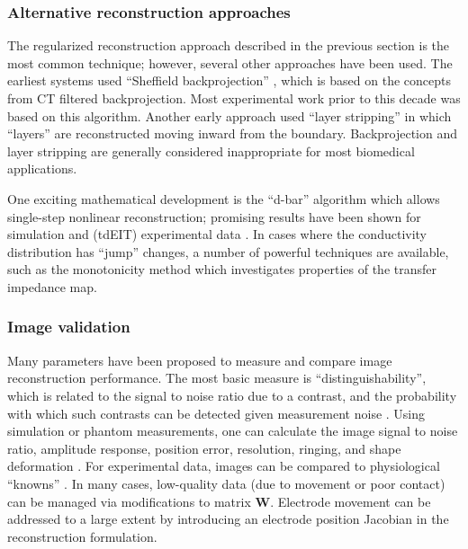 \documentclass[10pt,journal]{IEEEtran}\def\TBLWIDA{15mm}\def\TBLWIDB{60mm}
\newcommand{\WB}{\mathbf{W}}
\begin{document}
\subsubsection{Alternative reconstruction approaches}
The regularized reconstruction approach described in the
previous section is the most common technique; however, several
other approaches have been used. The earliest systems used
``Sheffield backprojection'' \cite{Brown1987Sheffield},
which is based on the concepts from CT filtered backprojection.
Most experimental work prior to this decade was based on this algorithm.
Another early approach used ``layer stripping'' \cite{Somersalo1991Layer}
in which ``layers'' are reconstructed moving inward from the boundary.
Backprojection and layer stripping are generally considered inappropriate for most biomedical applications.

One exciting mathematical development is the ``d-bar'' algorithm
which allows single-step nonlinear reconstruction; promising
results have been shown for simulation and (tdEIT) experimental
data  \cite{Herrera2015Direct}.
In cases where the conductivity distribution has ``jump'' changes,
a number of powerful techniques are available, such as the
monotonicity method \cite{Tamburrino2002Monotonicity} which
investigates properties of the transfer impedance map.


\subsubsection{Image validation}

Many parameters have been proposed to measure and compare
image reconstruction performance. The most basic measure
is ``distinguishability'', which is related to the signal to
noise ratio due to a contrast, and the probability with
which such contrasts can be detected given measurement
noise \cite{Isaacson1986Distinguishability, Lionheart2001Optimal}.
 Using simulation or phantom
measurements, one can calculate the
image signal to noise ratio,
amplitude response,
position error,
resolution, ringing, and shape deformation \cite{Adler2009GREIT}.
For experimental data, images can be compared to 
physiological ``knowns'' \cite{Grychtol2014Validation}.
In many cases, low-quality data (due to movement or
poor contact) can be managed
\cite{Mamatjan2013Quality}
 via modifications to matrix $\WB$.
Electrode movement can be addressed to a large extent by introducing
an electrode position Jacobian \cite{Soleimani2006Movement} in
the reconstruction formulation.
\end{document}
